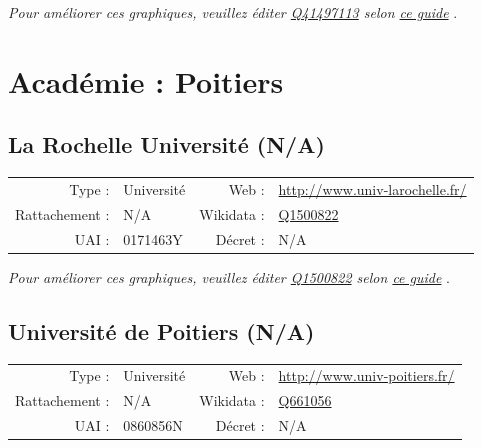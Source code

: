 \documentclass[11pt,french,landscape]{article}
\begin{document}
\textit{\scriptsize Pour améliorer ces graphiques, veuillez éditer \href{https://www.wikidata.org/entity/Q41497113}{Q41497113}  selon \href{https://github.com/cpesr/wikidataESR/blob/master/Rmd/wikidataESR.md}{ce guide}}
.


\newpage

\hypertarget{acaduxe9mie-poitiers}{%
\section{Académie : Poitiers}\label{acaduxe9mie-poitiers}}

\hypertarget{la-rochelle-universituxe9-na}{%
\subsection{La Rochelle Université
(N/A)}\label{la-rochelle-universituxe9-na}}

\begin{tabular*}{0.45\textwidth}{rp{2cm}rl}  
\hline  
Type : & Université & Web : &\href{http://www.univ-larochelle.fr/}{http://www.univ-larochelle.fr/} \\  
Rattachement : & N/A & Wikidata : & \href{https://www.wikidata.org/entity/Q1500822}{Q1500822} \\  
UAI : & 0171463Y & Décret : & N/A \\  
\hline  
\end{tabular*}

\textit{\scriptsize Pour améliorer ces graphiques, veuillez éditer \href{https://www.wikidata.org/entity/Q1500822}{Q1500822}  selon \href{https://github.com/cpesr/wikidataESR/blob/master/Rmd/wikidataESR.md}{ce guide}}
.


\newpage

\hypertarget{universituxe9-de-poitiers-na}{%
\subsection{Université de Poitiers
(N/A)}\label{universituxe9-de-poitiers-na}}

\begin{tabular*}{0.45\textwidth}{rp{2cm}rl}  
\hline  
Type : & Université & Web : &\href{http://www.univ-poitiers.fr/}{http://www.univ-poitiers.fr/} \\  
Rattachement : & N/A & Wikidata : & \href{https://www.wikidata.org/entity/Q661056}{Q661056} \\  
UAI : & 0860856N & Décret : & N/A \\  
\hline  
\end{tabular*}
\end{document}
